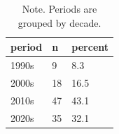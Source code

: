\begin{table}[htbp]
\raggedright
\caption{Publication period distribution among included reviews.}
\label{tab.publication.period}
\begin{tabular}{lll}
\toprule
period & n & percent \\
\midrule
1990s & 9 & 8.3 \\
2000s & 18 & 16.5 \\
2010s & 47 & 43.1 \\
2020s & 35 & 32.1 \\
\bottomrule
\end{tabular}

\caption*{Note. Periods are grouped by decade.}
\end{table}
